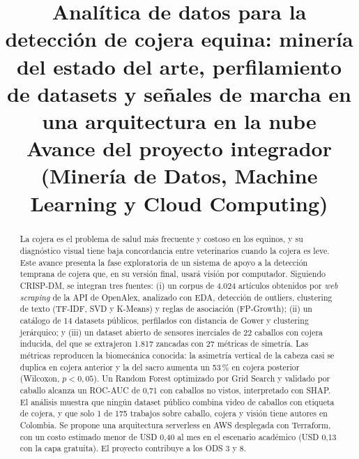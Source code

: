\documentclass[conference,a4paper]{IEEEtran}
\begin{document}
\title{Analítica de datos para la detección de cojera equina: minería del estado del arte, perfilamiento de datasets y señales de marcha en una arquitectura en la nube\\
\large Avance del proyecto integrador (Minería de Datos, Machine Learning y Cloud Computing)}

\author{
}

\maketitle

\begin{abstract}
La cojera es el problema de salud más frecuente y costoso en los equinos, y su diagnóstico visual tiene baja concordancia entre veterinarios cuando la cojera es leve. Este avance presenta la fase exploratoria de un sistema de apoyo a la detección temprana de cojera que, en su versión final, usará visión por computador. Siguiendo CRISP-DM, se integran tres fuentes: (i) un corpus de 4.024 artículos obtenidos por \emph{web scraping} de la API de OpenAlex, analizado con EDA, detección de outliers, clustering de texto (TF-IDF, SVD y K-Means) y reglas de asociación (FP-Growth); (ii) un catálogo de 14 datasets públicos, perfilados con distancia de Gower y clustering jerárquico; y (iii) un dataset abierto de sensores inerciales de 22 caballos con cojera inducida, del que se extrajeron 1.817 zancadas con 27 métricas de simetría. Las métricas reproducen la biomecánica conocida: la asimetría vertical de la cabeza casi se duplica en cojera anterior y la del sacro aumenta un 53\,\% en cojera posterior (Wilcoxon, $p<0{,}05$). Un Random Forest optimizado por Grid Search y validado por caballo alcanza un ROC-AUC de 0,71 con caballos no vistos, interpretado con SHAP. El análisis muestra que ningún dataset público combina video de caballos con etiqueta de cojera, y que solo 1 de 175 trabajos sobre caballo, cojera y visión tiene autores en Colombia. Se propone una arquitectura serverless en AWS desplegada con Terraform, con un costo estimado menor de USD 0,40 al mes en el escenario académico (USD 0,13 con la capa gratuita). El proyecto contribuye a los ODS 3 y 8.
\end{abstract}
\end{document}
